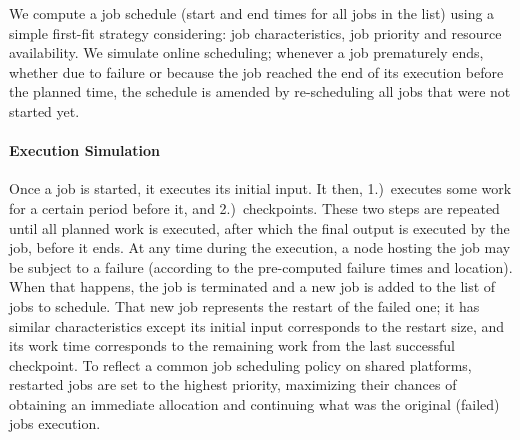 We compute a job schedule (start and end times for all jobs in the list) using
a simple first-fit strategy considering: job characteristics, job priority and
resource availability.  We simulate online scheduling; whenever a job
prematurely ends, whether due to failure or because the job reached the end of its
execution before the planned time, the schedule is amended by re-scheduling all
jobs that were not started yet.
%

\paragraph*{Execution Simulation}

Once a job is started, it executes its initial input. It then, 1.)~executes
some work for a certain period before it, and 2.)~checkpoints. These two steps
are repeated until all planned work is executed, after which the final output
is executed by the job, before it ends.  At any time during the execution, a
node hosting the job may be subject to a failure (according to the pre-computed
failure times and location). When that happens, the job is terminated and a new
job is added to the list of jobs to schedule. That new job represents the
restart of the failed one; it has similar characteristics except its initial
input corresponds to the restart size, and its work time corresponds to the
remaining work from the last successful checkpoint. To reflect a common job
scheduling policy on shared platforms, restarted jobs are set to the highest
priority, maximizing their chances of obtaining an immediate allocation and
continuing what was the original (failed) jobs execution.


